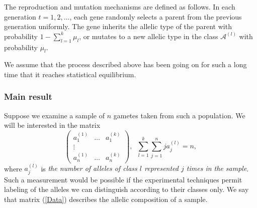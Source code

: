 \documentclass[12pt]{amsart}
\theoremstyle{definition}
\numberwithin{equation}{section}
\begin{document}
The reproduction and mutation mechanisms are defined as follows.
In each generation $t=1,2,\ldots$, each gene randomly selects a parent from the previous generation uniformly. The gene inherits the allelic type of the parent
with probability $1-\sum_{l=1}^k\mu_l$, or mutates to a new allelic type
in the class $\mathcal{A}^{(l)}$ with probability $\mu_l$.




We assume that the process described above has been going on for such a long time that it reaches statistical equilibrium.
\subsubsection{Main result}
Suppose we examine a sample of $n$ gametes taken from such a population. We will be interested in the matrix
\begin{equation}\label{Data}
\left(
\begin{array}{ccc}
  a_1^{(1)} & \ldots & a_1^{(k)} \\
  \vdots &  &  \\
  a_n^{(1)} & \ldots & a_n^{(k)}
\end{array}
\right),\;\;\sum\limits_{l=1}^k\sum\limits_{j=1}^nja_j^{(l)}=n,
\end{equation}
where $a_j^{(l)}$ is\textit{ the number of alleles of class $l$ represented $j$ times in the sample}. Such a measurement would be possible if the experimental techniques permit labeling of the alleles we can distinguish according to their classes only.  We say that matrix (\ref{Data}) describes the allelic composition of a sample.
\end{document}
